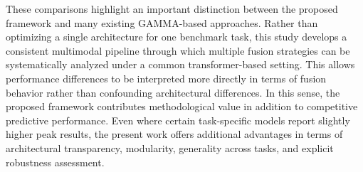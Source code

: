\documentclass[preprint,12pt]{elsarticle}
\begin{document}
These comparisons highlight an important distinction between the proposed framework and many existing GAMMA-based approaches. Rather than optimizing a single architecture for one benchmark task, this study develops a consistent multimodal pipeline through which multiple fusion strategies can be systematically analyzed under a common transformer-based setting. This allows performance differences to be interpreted more directly in terms of fusion behavior rather than confounding architectural differences. In this sense, the proposed framework contributes methodological value in addition to competitive predictive performance. Even where certain task-specific models report slightly higher peak results, the present work offers additional advantages in terms of architectural transparency, modularity, generality across tasks, and explicit robustness assessment.
\end{document}
